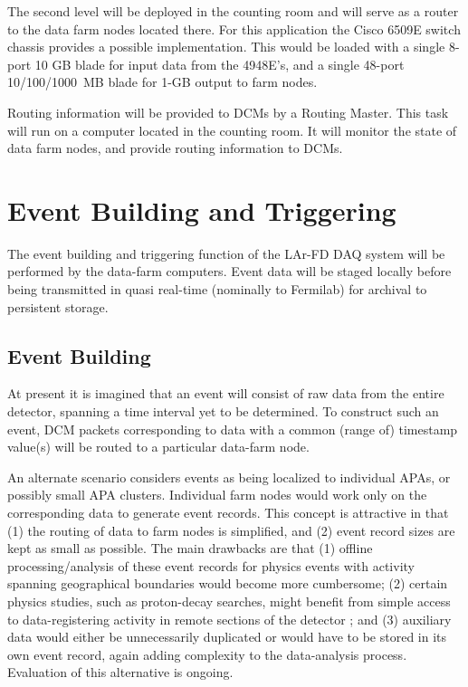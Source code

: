 The second level will be deployed in the counting room and will 
serve as a router to the data farm nodes located there.  For this application 
the Cisco 6509E switch chassis provides a possible implementation.  This 
would be loaded with a single 8-port 10 GB blade for input data from the 
4948E's, and a single 48-port 10/100/1000~MB blade for 1-GB output to 
farm nodes.

Routing information will be provided to DCMs by a Routing Master.  This 
task will run on a computer located in the counting room.  It will monitor 
the state of data farm nodes, and provide routing information to DCMs.


\section{Event Building and Triggering}
\label{sec:v5-trig-evtbuild}

The event building and triggering function of the LAr-FD DAQ system 
will be performed by the data-farm computers.  Event data will be staged 
locally before being transmitted in quasi real-time (nominally to Fermilab) 
for archival to persistent storage. 

\subsection{Event Building}

At present it is imagined that an event will consist of raw data from the 
entire detector, spanning a time interval yet to be determined.  To construct 
such an event, DCM packets corresponding to data with a common (range of) 
timestamp value(s) will be routed to a particular data-farm node.  

An alternate scenario considers events as being localized to individual 
APAs, or possibly small APA clusters.  Individual farm nodes would work 
only on the corresponding data to generate event records.
This concept is attractive in that (1) the routing of data to farm nodes 
is simplified, and (2) event record sizes are kept as small as possible.  
The main drawbacks are that (1) offline processing/analysis of these event 
records for physics events with activity spanning geographical 
boundaries would become more cumbersome; (2) certain physics studies, such 
as proton-decay searches, might benefit from 
simple access to data-registering activity in remote sections of the detector 
; and (3) auxiliary data  
would either be unnecessarily duplicated or 
would have to be stored in its own event record, again adding complexity 
to the data-analysis process.  Evaluation of this alternative is ongoing.

